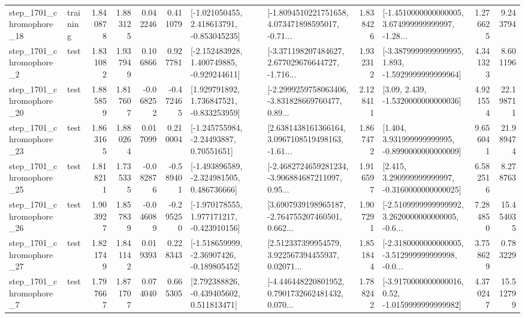 \begin{tabular}{llrrrrllrlrr}
 step\_1701\_chromophore\_18 &  training &      1.840878 &    1.883125 &      0.042246 &  0.411079 &   [-1.021050455, 2.418613791, -0.853045235] &  [-1.8094510221751658, 4.073471898595017, -0.71... &       1.838426 &  [-1.4510000000000005, 3.674999999999997, -1.28... &            1.276625 &          9.243794 \\
  step\_1701\_chromophore\_2 &      test &      1.831082 &    1.937949 &      0.106866 &  0.927781 &   [-2.152483928, 1.400749885, -0.929244611] &  [-3.371198207484627, 2.677029676644727, -1.716... &       1.932312 &  [-3.3879999999999995, 1.893, -1.5929999999999964] &            4.341323 &          8.601196 \\
 step\_1701\_chromophore\_20 &      test &      1.885859 &    1.817607 &     -0.068252 & -0.472465 &    [1.929791892, 1.736847521, -0.833253959] &  [-2.2999259758063406, -3.831828669760477, 0.89... &       2.128411 &                 [3.09, 2.439, -1.5320000000000036] &            4.921554 &         22.198711 \\
 step\_1701\_chromophore\_23 &      test &      1.863165 &    1.880264 &      0.017099 &  0.210004 &     [-1.245755984, -2.24493887, 0.70551651] &  [2.6381438161366164, 3.0967108519498163, -1.61... &       1.867472 &    [1.404, 3.931999999999995, -0.8990000000000009] &            9.656041 &         21.989474 \\
 step\_1701\_chromophore\_25 &      test &      1.818211 &    1.735335 &     -0.082876 & -0.589401 &   [-1.493896589, -2.324981505, 0.486736666] &  [-2.4682724659281234, -3.906884687211097, 0.95... &       1.916597 &    [2.415, 3.290999999999997, -0.3160000000000025] &            6.582516 &          8.278763 \\
 step\_1701\_chromophore\_26 &      test &      1.903927 &    1.857839 &     -0.046089 & -0.295250 &   [-1.970178555, 1.977171217, -0.423910156] &  [3.6907939198965187, -2.764755207460501, 0.662... &       1.907291 &  [-2.5109999999999992, 3.2620000000000005, -0.6... &            7.284850 &         15.454035 \\
 step\_1701\_chromophore\_27 &      test &      1.821749 &    1.841142 &      0.019393 &  0.228343 &   [-1.518659999, -2.36907426, -0.189805452] &  [2.512337399954579, 3.922567394455937, 0.02071... &       1.851844 &  [-2.3180000000000005, -3.512999999999998, -0.0... &            3.758629 &          0.783229 \\
  step\_1701\_chromophore\_7 &      test &      1.797667 &    1.871707 &      0.074040 &  0.665305 &    [2.792388826, -0.439405602, 0.511813471] &  [-4.446448220801952, 0.7901732662481432, 0.070... &       1.788242 &   [-3.9170000000000016, 0.52, -1.0159999999999982] &            4.370247 &         15.512799 \\

\end{tabular}
